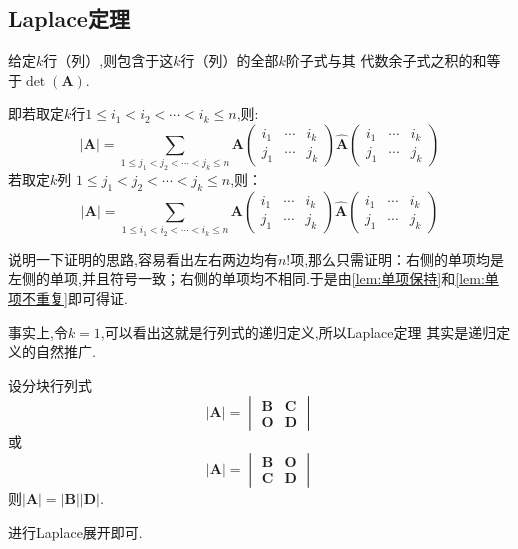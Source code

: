 \subsection{Laplace定理}
\begin{formal}
\begin{theorem}[Laplace定理]\label{thm:Laplace定理}
给定$k$行（列）,则包含于这$k$行（列）的全部$k$阶子式与其
代数余子式之积的和等于$ \det\left(\bm{A}\right).$

即若取定$k$行$1\leqslant i_1<i_2<
\cdots<i_k\leqslant n$,则:
\[
\left|\bm{A}\right| = \sum_{1
\leqslant j_1 <j_2< \cdots
< j_k \leqslant n}\bm{A}\begin{pmatrix}
    i_1 & \cdots & i_k \\
    j_1 & \cdots & j_k
\end{pmatrix} \widehat{\bm{A}}\begin{pmatrix}
    i_1 & \cdots & i_k \\
    j_1 & \cdots & j_k
\end{pmatrix} 
\]
若取定$k$列
$1\leqslant j_1<j_2<\cdots
<j_k\leqslant n$,则：
\[
\left|\bm{A}\right| =
 \sum_{1\leqslant i_1 <i_2< \cdots
< i_k \leqslant n}\bm{A}\begin{pmatrix}
    i_1 & \cdots & i_k \\
    j_1 & \cdots & j_k
\end{pmatrix} \widehat{\bm{A}}\begin{pmatrix}
    i_1 & \cdots & i_k \\
    j_1 & \cdots & j_k
\end{pmatrix} 
\]
\end{theorem}
\begin{Proof}
说明一下证明的思路,容易看出左右两边均有$n!$项,那么只需证明：右侧的单项均是左侧的单项,并且符号一致；右侧的单项均不相同.于是由\cref{lem:单项保持}和\cref{lem:单项不重复}即可得证.
\end{Proof}
\end{formal}
\begin{red}
\begin{remark}
    事实上,令$k = 1$,可以看出这就是行列式的递归定义,所以\textup{Laplace}定理
其实是递归定义的自然推广.
\end{remark}
\end{red}
\begin{green}
\begin{corollary}[分块行列式]\label{cor:分块行列式}
    设分块行列式\[
    \left|\bm{A}\right|=\begin{vmatrix}
        \bm{B}&\bm{C}\\
        \bm{O}&\bm{D}
    \end{vmatrix}
    \]或
    \[
    \left|\bm{A}\right|=
    \begin{vmatrix}
        \bm{B}&\bm{O}\\
        \bm{C}&\bm{D}
    \end{vmatrix}
    \]则$\left|\bm{A}\right|=\left|\bm{B}\right|\left|\bm{D}\right|.$
\end{corollary}
\begin{Proof}
进行\textup{Laplace}展开即可.
\end{Proof}
\end{green}
